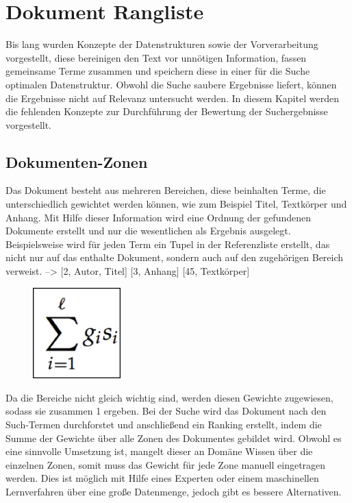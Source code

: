 \section {Dokument Rangliste}
Bis lang wurden Konzepte der Datenstrukturen sowie der Vorverarbeitung
vorgestellt, diese bereinigen den Text vor unnötigen Information,
fassen gemeinsame Terme zusammen und speichern diese in einer für die
Suche optimalen Datenstruktur. Obwohl die Suche saubere Ergebnisse
liefert, können die Ergebnisse nicht auf Relevanz untersucht werden.
\newline
In diesem Kapitel werden die fehlenden Konzepte zur Durchführung der
Bewertung der Suchergebnisse vorgestellt.

\subsection[Dokumenten{}-Zonen]{Dokumenten-Zonen}
Das Dokument besteht aus mehreren Bereichen, diese beinhalten Terme, die
unterschiedlich gewichtet werden können, wie zum Beispiel Titel,
Textkörper und Anhang. Mit Hilfe dieser Information wird eine Ordnung
der gefundenen Dokumente erstellt und nur die wesentlichen als Ergebnis
ausgelegt.
\bigbreak
Beispielsweise wird für jeden Term ein Tupel in der Referenzliste
erstellt, das nicht nur auf das enthalte Dokument, sondern auch auf den
zugehörigen Bereich verweist. 
\bigbreak
[Willy]--{\textgreater} [2, Autor, Titel] [3, Anhang] [45, Textkörper]
\newline
\begin{figure}
  \centering
\includegraphics[width=3.381cm,height=3.507cm]{bilder/SeminararbeitArkadij-img3.png}
\end{figure}
Da die Bereiche nicht gleich wichtig sind, werden diesen Gewichte
zugewiesen, sodass sie zusammen 1 ergeben. Bei der Suche wird das
Dokument nach den Such-Termen durchforstet und anschließend ein
Ranking erstellt, indem die Summe der Gewichte über alle Zonen des
Dokumentes gebildet wird. 
\bigbreak
Obwohl es eine sinnvolle Umsetzung ist, mangelt dieser an Domäne Wissen
über die einzelnen Zonen, somit muss das Gewicht für jede Zone manuell
eingetragen werden. Dies ist möglich mit Hilfe eines Experten oder
einem maschinellen Lernverfahren über eine große Datenmenge, jedoch
gibt es bessere Alternativen. 

